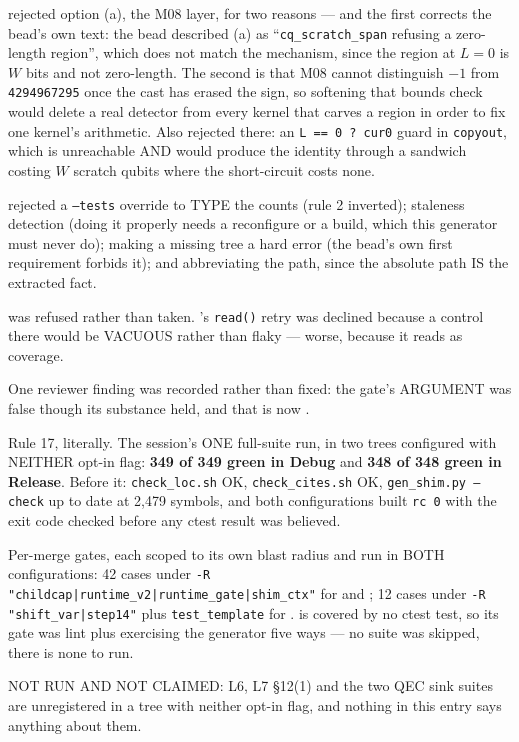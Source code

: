  rejected option (a), the M08 layer, for two reasons --- and the first corrects
the bead's own text: the bead described (a) as ``\texttt{cq\_scratch\_span} refusing a
zero-length region'', which does not match the mechanism, since the region at $L=0$ is $W$
bits and not zero-length. The second is that M08 cannot distinguish $-1$ from
\texttt{4294967295} once the cast has erased the sign, so softening that bounds check would
delete a real detector from every kernel that carves a region in order to fix one kernel's
arithmetic. Also rejected there: an \texttt{L == 0 ? cur0} guard in \texttt{copyout}, which
is unreachable AND would produce the identity through a sandwich costing $W$ scratch qubits
where the short-circuit costs none.

 rejected a \texttt{--tests} override to TYPE the counts (rule 2 inverted);
staleness detection (doing it properly needs a reconfigure or a build, which this generator
must never do); making a missing tree a hard error (the bead's own first requirement forbids
it); and abbreviating the path, since the absolute path IS the extracted fact.

 was refused rather than taken. 's \texttt{read()} retry was declined
because a control there would be VACUOUS rather than flaky --- worse, because it reads as
coverage.

One reviewer finding was recorded rather than fixed: the  gate's ARGUMENT was
false though its substance held, and that is now .

Rule 17, literally. The session's ONE full-suite run, in two trees configured with NEITHER
opt-in flag: \textbf{349 of 349 green in Debug} and \textbf{348 of 348 green in Release}.
Before it: \texttt{check\_loc.sh} OK, \texttt{check\_cites.sh} OK, \texttt{gen\_shim.py
--check} up to date at 2{,}479 symbols, and both configurations built \texttt{rc 0} with the
exit code checked before any ctest result was believed.

Per-merge gates, each scoped to its own blast radius and run in BOTH configurations: 42
cases under \texttt{-R "childcap|runtime\_v2|runtime\_gate|shim\_ctx"} for  and
; 12 cases under \texttt{-R "shift\_var|step14"} plus \texttt{test\_template} for
.  is covered by no ctest test, so its gate was lint plus exercising the
generator five ways --- no suite was skipped, there is none to run.

NOT RUN AND NOT CLAIMED: L6, L7 \S12(1) and the two QEC sink suites are unregistered in a
tree with neither opt-in flag, and nothing in this entry says anything about them.

